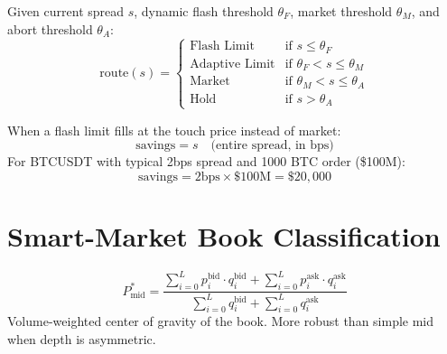 \documentclass[11pt,a4paper]{article}
\begin{document}
\begin{formulabox}[title={\S7.3 — Route Decision}]
Given current spread $s$, dynamic flash threshold $\theta_F$, market threshold $\theta_M$, and abort threshold $\theta_A$:
\begin{equation}
  \text{route}(s) = \begin{cases}
    \text{Flash Limit}  & \text{if } s \leq \theta_F \\
    \text{Adaptive Limit} & \text{if } \theta_F < s \leq \theta_M \\
    \text{Market}       & \text{if } \theta_M < s \leq \theta_A \\
    \text{Hold}         & \text{if } s > \theta_A
  \end{cases}
\end{equation}
\end{formulabox}

\begin{formulabox}[title={\S7.4 — Flash Limit Savings}]
When a flash limit fills at the touch price instead of market:
\begin{equation}
  \text{savings} = s \quad \text{(entire spread, in bps)}
\end{equation}
For BTCUSDT with typical 2bps spread and 1000 BTC order (\$100M):
\begin{equation}
  \text{savings} = 2 \text{bps} \times \$100\text{M} = \$20{,}000
\end{equation}
\end{formulabox}


\section{Smart-Market Book Classification}

\begin{formulabox}[title={\S8.1 — Depth-Weighted Mid Price}]
\begin{equation}
  P_{\text{mid}}^{*} = \frac{\displaystyle\sum_{i=0}^{L} p_i^{\text{bid}} \cdot q_i^{\text{bid}} + \sum_{i=0}^{L} p_i^{\text{ask}} \cdot q_i^{\text{ask}}}{\displaystyle\sum_{i=0}^{L} q_i^{\text{bid}} + \sum_{i=0}^{L} q_i^{\text{ask}}}
\end{equation}
Volume-weighted center of gravity of the book. More robust than simple mid when depth is asymmetric.
\end{formulabox}
\end{document}
